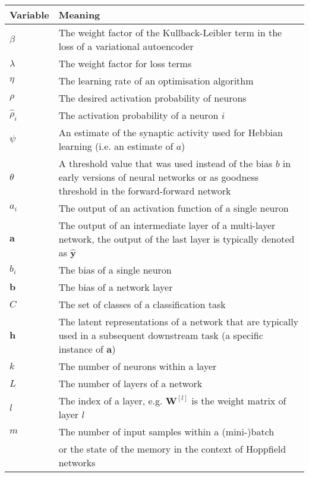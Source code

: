 \begin{tabular}{ p{3cm} p{11cm} }
	\textbf{Variable} & \textbf{Meaning}\\
	\hline
	$\beta$ & The weight factor of the Kullback-Leibler term in the loss of a variational autoencoder\\
	$\lambda$ & The weight factor for loss terms\\
	$\eta$ & The learning rate of an optimisation algorithm\\
	$\rho$ & The desired activation probability of neurons\\
	$\hat{\rho}_i$ & The activation probability of a neuron $i$\\
	$\psi$ & An estimate of the synaptic activity used for Hebbian learning (i.e. an estimate of $a$)\\
	$\theta$ & A threshold value that was used instead of the bias $b$ in early versions of neural networks or as goodness threshold in the forward-forward network\\
	$a_i$ & The output of an activation function of a single neuron\\
	$\boldsymbol{a}$ & The output of an intermediate layer of a multi-layer network, the output of the last layer is typically denoted as $\boldsymbol{\hat{y}}$\\
	$b_i$ & The bias of a single neuron\\
	$\boldsymbol{b}$ & The bias of a network layer\\
	$C$ & The set of classes of a classification task\\
	$\boldsymbol{h}$ & The latent representations of a network that are typically used in a subsequent downstream task (a specific instance of $\boldsymbol{a}$)\\
	$k$ & The number of neurons within a layer\\
	$L$ & The number of layers of a network\\
	$l$ & The index of a layer, e.g. $\boldsymbol{W}^{[l]}$ is the weight matrix of layer $l$\\
	$m$ & The number of input samples within a (mini-)batch\\
	    & or the state of the memory in the context of Hoppfield networks\\
\end{tabular}


